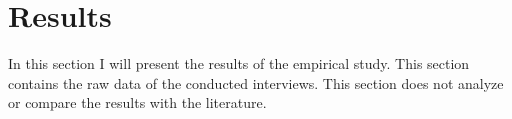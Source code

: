 
\chapter{Results}
\label{chapter:empirical}

In this section I will present the results of the empirical study. This section contains the raw data of the conducted interviews. This section does not analyze or compare the results with the literature.
